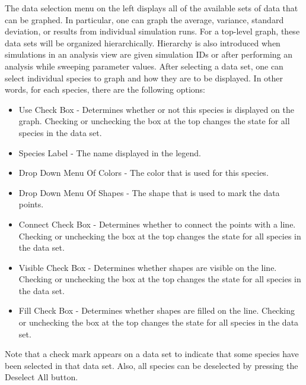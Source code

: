 \documentclass[titlepage,11pt]{article}
\begin{document}
The data selection menu on the left displays all of the
available sets of data that can be graphed.  In particular, one can
graph the average, variance, standard deviation, or results from 
individual simulation runs.  For a top-level graph, these
data sets will be organized hierarchically.  Hierarchy is also 
introduced when simulations in an analysis view are given
simulation IDs or after performing an analysis while sweeping parameter
values.  After selecting a data set, one can select individual species to 
graph and how they are to be displayed.  In other words, for each 
species, there are the following options: 
\begin{itemize}
\item Use Check Box - Determines
whether or not this species is displayed on the graph.  Checking or 
unchecking the box at the top changes the state for all species in
the data set. 
\item Species Label - The name displayed in the legend. 
\item Drop Down Menu Of Colors - The color that is used for this species. 
\item Drop Down Menu Of Shapes - The shape that is used to mark the
  data points. 
\item Connect Check Box -
Determines whether to connect the points with a line. Checking or 
unchecking the box at the top changes the state for all species in
the data set. 
\item Visible Check Box - Determines
whether shapes are visible on the line.  Checking or 
unchecking the box at the top changes the state for all species in
the data set.
\item Fill Check Box - Determines whether shapes are filled
on the line.  Checking or 
unchecking the box at the top changes the state for all species in
the data set.
\end{itemize}
Note that a check mark appears on a data set to indicate that some
species have been selected in that data set.  Also, all species can
be deselected by pressing the Deselect All button.
\end{document}
